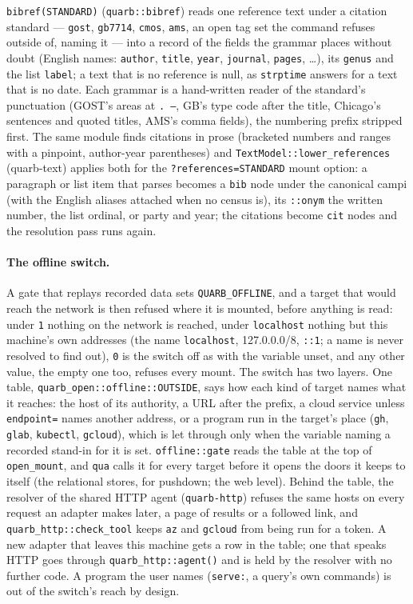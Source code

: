 \documentclass{report}
\begin{document}
\noindent
  \texttt{bibref(STANDARD)} (\texttt{quarb::bibref}) reads one
  reference text under a citation standard — \texttt{gost},
  \texttt{gb7714}, \texttt{cmos}, \texttt{ams}, an open tag set
  the command refuses outside of, naming it — into a record of
  the fields the grammar places without doubt (English names:
  \texttt{author}, \texttt{title}, \texttt{year},
  \texttt{journal}, \texttt{pages}, \ldots), its \texttt{genus}
  and the list \texttt{label}; a text that is no reference is
  null, as \texttt{strptime} answers for a text that is no date.
  Each grammar is a hand-written reader of the standard's
  punctuation (GOST's areas at \texttt{. –}, GB's type code after
  the title, Chicago's sentences and quoted titles, AMS's comma
  fields), the numbering prefix stripped first. The same module
  finds citations in prose (bracketed numbers and ranges with a
  pinpoint, author-year parentheses) and
  \texttt{TextModel::lower\_references} (quarb-text) applies both
  for the \texttt{?references=STANDARD} mount option: a paragraph
  or list item that parses becomes a \texttt{bib} node under the
  canonical campi (with the English aliases attached when no
  census is), its \texttt{::onym} the written number, the list
  ordinal, or party and year; the citations become \texttt{cit}
  nodes and the resolution pass runs again.

\paragraph{The offline switch.}
A gate that replays recorded data sets \texttt{QUARB\_OFFLINE},
  and a target that would reach the network is then refused where
  it is mounted, before anything is read: under \texttt{1}
  nothing on the network is reached, under \texttt{localhost}
  nothing but this machine's own addresses (the name
  \texttt{localhost}, 127.0.0.0/8, \texttt{::1}; a name is never
  resolved to find out), \texttt{0} is the switch off as with the
  variable unset, and any other value, the empty one too, refuses
  every mount.
The switch has two layers.
One table, \texttt{quarb\_open::offline::OUTSIDE}, says how each
  kind of target names what it reaches: the host of its authority,
  a URL after the prefix, a cloud service unless
  \texttt{endpoint=} names another address, or a program run in
  the target's place (\texttt{gh}, \texttt{glab},
  \texttt{kubectl}, \texttt{gcloud}), which is let through only
  when the variable naming a recorded stand-in for it is set.
\texttt{offline::gate} reads the table at the top of
  \texttt{open\_mount}, and \texttt{qua} calls it for every
  target before it opens the doors it keeps to itself (the
  relational stores, for pushdown; the web level).
Behind the table, the resolver of the shared HTTP agent
  (\texttt{quarb-http}) refuses the same hosts on every request an
  adapter makes later, a page of results or a followed link, and
  \texttt{quarb\_http::check\_tool} keeps \texttt{az} and
  \texttt{gcloud} from being run for a token.
A new adapter that leaves this machine gets a row in the table;
  one that speaks HTTP goes through \texttt{quarb\_http::agent()}
  and is held by the resolver with no further code.
A program the user names (\texttt{serve:}, a query's own
  commands) is out of the switch's reach by design.
\end{document}
